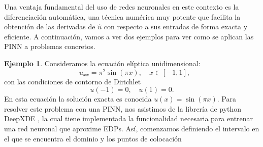 \documentclass[a4paper,11pt,spanish, twoside, leqno]{tfg-uam}
\theoremstyle{definition}
\newtheorem{exmp}[teor]{Ejemplo}
\begin{document}
Una ventaja fundamental del uso de redes neuronales en este contexto es la diferenciación automática, una técnica numérica muy potente que facilita la obtención de las derivadas de $\hat{u}$ con respecto a sus entradas de forma exacta y eficiente.
A continuación, vamos a ver dos ejemplos para ver como se aplican las PINN a problemas concretos.

\begin{mdframed}
    \begin{exmp}
        Consideramos la ecuación elíptica unidimensional:
        \begin{equation*}
        -u_{xx} = \pi^2 \sin(\pi x), \quad x \in [-1, 1],
        \end{equation*}
        con las condiciones de contorno de Dirichlet
        \begin{equation*}
        u(-1) = 0, \quad u(1) = 0.
        \end{equation*}
        En esta ecuación la solución exacta es  conocida $ u(x) = \sin(\pi x)$. Para resolver este problema con una PINN, nos asistimos de la librería de python DeepXDE \cite{lu2021deepxde}, la cual tiene implementada la funcionalidad necesaria para entrenar una red neuronal que aproxime EDPs. Así, comenzamos definiendo el intervalo en el que se encuentra el dominio y los puntos de colocación
        

\end{exmp}
\end{mdframed}
\end{document}
